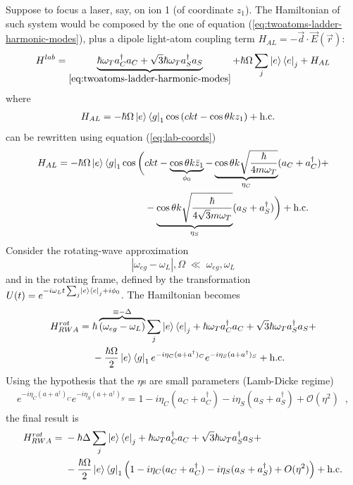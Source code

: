 Suppose to focus a laser, say, on ion 1 (of coordinate $z_1$). The Hamiltonian of such system would be composed by the one of equation (\ref{eq:twoatoms-ladder-harmonic-modes}), plus a dipole light-atom coupling term $H_{AL} = -\vec{d}\cdot\vec{E}(\vec{r})$:
\begin{equation}
H^{lab} = 
\underbrace{
\hbar \omega_Ta_{C}^\dag a_{C}
+
\sqrt{3}\hbar\omega_Ta_S^\dag a_S
}_{\ref{eq:twoatoms-ladder-harmonic-modes}}
+ \hbar\Omega\sum_j\ket{e}\bra{e}_j + H_{AL}
\end{equation}
where
\begin{align*}
H_{AL} &= -\hbar\Omega\ket{e}\bra{g}_1
\cos\left(ckt-\cos\theta kz_1\right) + \text{h.c.}
\end{align*}
can be rewritten using equation (\ref{eq:lab-coords})
\begin{align*}
    H_{AL} = -\hbar\Omega\ket{e}\bra{g}_1 \cos
\bigg(&
    ckt -
    \underbrace{\cos\theta k\bar{z}_1}_{\phi_0}
    -\underbrace{\cos\theta k \sqrt{\frac{\hbar}{4m\omega_T}}}
        _{\eta_{C}}
    (a_{C}+a^\dag_{C}) + \\
    &-\underbrace{\cos\theta k \sqrt{\frac{\hbar}{4\sqrt{3}m\omega_T}}}
        _{\eta_{S}}
    (a_{S}+a^\dag_{S})
\bigg)
+ \text{h.c.}
\end{align*}
Consider the rotating-wave approximation 
$$|\omega_{eg}-\omega_L|,\Omega \;\ll\; \omega_{eg},\omega_L$$
and in the rotating frame, defined by the transformation
$U(t) = e^{-i\omega_L t\sum_j\ket{e}\bra{e}_j + i \phi_0}$. The Hamiltonian becomes
\begin{align*}
\begin{split}
H^{rot}_{RWA} =\; &
\hbar \overbrace{\left(\omega_{eg}-\omega_{L}\right)}
    ^{\equiv-\Delta}
\sum_j \ket{e}\bra{e}_j 
+
\hbar \omega_{T}a_{C}^\dag a_{C}
+
\sqrt{3}\hbar\omega_Ta_S^\dag a_S
+\\
& -\frac{\hbar\Omega}{2}\ket{e}\bra{g}_1
e^{-i\eta_{C}(a+a^\dag)_{C}}
e^{-i\eta_{S}(a+a^\dag)_{S}}
+ \text{h.c.}
\end{split}
\end{align*}
Using the hypothesis that the $\eta$s are small parameters (Lamb-Dicke regime)
\begin{align*}
    e^{-i\eta_{C}(a+a^\dag)_{C}}
    e^{-i\eta_{S}(a+a^\dag)_{S}}
    = 1 
    - i\eta_{C}(a_{C}+a_{C}^\dag) 
    - i\eta_{S}(a_{S}+a_{S}^\dag) 
    + \mathcal{O}(\eta^2) \;\;,
\end{align*}
the final result is
\begin{align}
\begin{split}
H^{rot}_{RWA} =\; &
-\hbar\Delta
\sum_j \ket{e}\bra{e}_j 
+
\hbar \omega_{T}a_{C}^\dag a_{C}
+
\sqrt{3}\hbar\omega_Ta_S^\dag a_S
+\\
& -\frac{\hbar\Omega}{2}\ket{e}\bra{g}_1
\left(
1 - i\eta_{C}(a_{C}+a_{C}^\dag)
- i\eta_{S}(a_{S}+a_{S}^\dag)
+{O}(\eta^2)
\right)
+ \text{h.c.}
\end{split}
\end{align}

